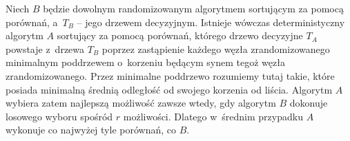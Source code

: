 \subproblem %
Niech $B$ będzie dowolnym randomizowanym algorytmem sortującym za pomocą porównań, a~$T_B$ -- jego drzewem decyzyjnym.
Istnieje wówczas deterministyczny algorytm $A$ sortujący za pomocą porównań, którego drzewo decyzyjne $T_A$ powstaje z~drzewa $T_B$ poprzez zastąpienie każdego węzła zrandomizowanego minimalnym poddrzewem o~korzeniu będącym synem tegoż węzła zrandomizowanego.
Przez minimalne poddrzewo rozumiemy tutaj takie, które posiada minimalną średnią odległość od swojego korzenia od liścia.
Algorytm $A$ wybiera zatem najlepszą możliwość zawsze wtedy, gdy algorytm $B$ dokonuje losowego wyboru spośród $r$ możliwości.
Dlatego w~średnim przypadku $A$ wykonuje co najwyżej tyle porównań, co $B$.
